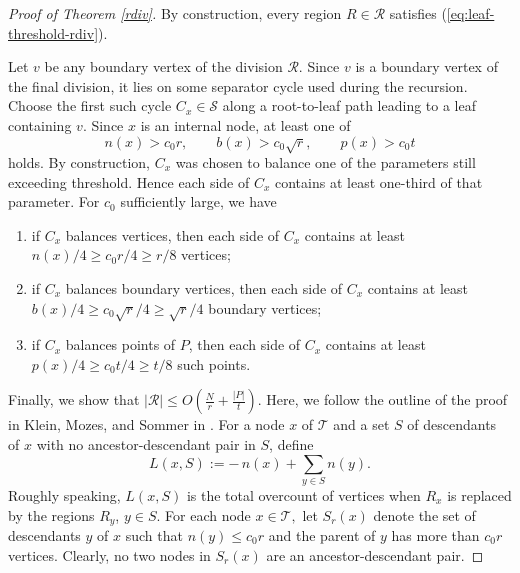 \documentclass[11pt]{article}
\theoremstyle{plain}
\theoremstyle{definition}
\theoremstyle{remark}
\begin{document}
\begin{proof}[Proof of Theorem \ref{rdiv}]
\noindent By construction, every region $R \in \mathcal R$ satisfies (\ref{eq:leaf-threshold-rdiv}).  








Let \(v\) be any boundary vertex of the division \(\mathcal R\). Since \(v\) is a boundary vertex of the final division, it lies on some separator cycle used during the recursion. Choose the first such cycle \(C_x\in\mathcal S\) along a root-to-leaf path leading to a leaf containing \(v\).  Since \(x\) is an internal node, at least one of
\[
n(x)>c_0r,\qquad
b(x)>c_0\sqrt r,\qquad
p(x)>c_0t
\]
holds. By construction, \(C_x\) was chosen to balance one of the parameters still exceeding threshold. Hence each side of \(C_x\) contains at least one-third of that parameter. For $c_0$ sufficiently large, we have
\begin{enumerate}
    \item if \(C_x\) balances vertices, then each side of \(C_x\) contains at least \(n(x)/4\ge c_0r/4 \geq r/8\) vertices;
    \item if \(C_x\) balances boundary vertices, then each side of \(C_x\) contains at least \(b(x)/4\ge c_0\sqrt r/4\geq \sqrt{r}/4\) boundary vertices;
    \item if \(C_x\) balances points of \(P\), then each side of \(C_x\) contains at least \(p(x)/4\ge c_0t/4 \geq t/8\) such points.
\end{enumerate}
 
 








































Finally, we show that $|\mathcal R| \leq O\!\left(\frac{N}{r} + \frac{|P|}{t}\right)$.  Here, we follow the outline of the proof in Klein, Mozes, and Sommer in \cite{KMS13}.  For a node \(x\) of \(\mathcal T\) and a set \(S\) of descendants of \(x\) with no ancestor-descendant pair in $S$, define
\[
L(x,S):=-\,n(x)+\sum_{y\in S} n(y).
\]
Roughly speaking, \(L(x,S)\) is the total overcount of vertices when \(R_x\) is replaced by the regions \(R_y\), \(y\in S\). For each node $x \in \mathcal T,$ let \(S_r(x)\) denote the set of descendants \(y\) of \(x\) such that $
n(y)\le c_0r$ and the parent of \(y\) has more than \(c_0r\) vertices.  Clearly, no two nodes in $S_r(x)$ are an ancestor-descendant pair.






\end{proof}
\end{document}
